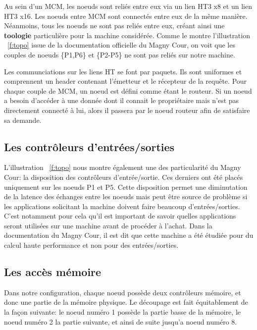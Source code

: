     Au sein d'un MCM, les noeuds sont reliés entre eux via un lien HT3 x8 et un
    lien HT3 x16. Les noeuds entre MCM sont connectés entre eux de la même
    manière. Néanmoins, tous les noeuds ne sont pas reliés entre eux, créant
    ainsi une \textbf{toologie} particulière pour la machine considérée. Comme
    le montre l'illustration ~\ref{f:topo} issue de la documentation officielle
    du Magny Cour, on voit que les couples de noeuds \{P1,P6\} et \{P2-P5\} ne
    sont pas reliés sur notre machine.


    Les communciations sur les liens HT se font par
    paquets\cite{CacheHierarchy}. Ils sont uniformes et comprennent un header
    contenant l'émetteur et le récepteur de la requête. Pour chaque couple de
    MCM, un noeud est défini comme étant le routeur. Si un noeud a besoin
    d'accéder à une donnée dont il connait le propriétaire mais n'est pas
    directement connecté à lui, alors il passera par le noeud routeur afin de
    satisfaire sa demande.


  \subsection{Les contrôleurs d'entrées/sorties}

    L'illustration ~\ref{f:topo} nous montre également une des particularité du
    Magny Cour: la disposition des contrôleurs d'entrée/sortie. Ces derniers ont
    été placés uniquement sur les noeuds P1 et P5. Cette disposition permet une
    diminutation de la latence des échanges entre les noeuds mais peut être
    source de problème si les applications solicitant la machine doivent faire
    beaucoup d'entrées/sorties. C'est notamment pour cela qu'il est important de
    savoir quelles applications seront utilisées sur une machine avant de
    procéder à l'achat. Dans la documentation du Magny Cour, il est dit que
    cette machine a été étudiée pour du calcul haute performance et non pour des
    entrées/sorties.

  \subsection{Les accès mémoire}

    Dans notre configuration, chaque noeud possède deux contrôleurs mémoire, et
    donc une partie de la mémoire physique. Le découpage est fait équitablement
    de la façon suivante: le noeud numéro 1 possède la partie basse de la
    mémoire, le noeud numéro 2 la partie suivante, et ainsi de suite jusqu'a
    noeud numéro 8.

